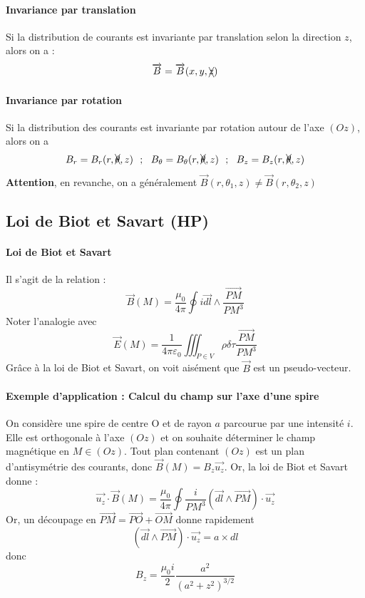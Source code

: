 \documentclass[french]{book}
\theoremstyle{plain}
\theoremstyle{definition}
\theoremstyle{remark}
\begin{document}
\paragraph{Invariance par translation} Si la distribution de courants est invariante par translation selon la direction $z$, alors on a : $$\overrightarrow{B}=\overrightarrow{B}(x,y,\xcancel{z})$$
\paragraph{Invariance par rotation} Si la distribution des courants est invariante par rotation autour de l'axe $(Oz)$, alors on a $$B_r=B_r(r,\xcancel{\theta},z)\ \ ; \ \ B_\theta=B_\theta(r,\xcancel{\theta},z) \ \ ; \ \ B_z=B_z(r,\xcancel{\theta},z)$$ \textbf{Attention}, en revanche, on a généralement $\overrightarrow{B}(r,\theta_1,z)\ne\overrightarrow{B}(r,\theta_2,z)$
\subsection{Loi de Biot et Savart (HP)}
\paragraph{Loi de Biot et Savart} Il s'agit de la relation : $$\overrightarrow{B}(M)=\frac{\mu_0}{4\pi}\oint i\overrightarrow{dl}\wedge\frac{\overrightarrow{PM}}{PM^3}$$ Noter l'analogie avec  $$\overrightarrow{E}(M)=\frac{1}{4\pi\varepsilon_0}\iiint_{P\in V} \rho\delta\tau\frac{\overrightarrow{PM}}{PM^3}$$ Grâce à la loi de Biot et Savart, on voit aisément que $\overrightarrow{B}$ est un pseudo-vecteur.
\paragraph{Exemple d'application : Calcul du champ sur l'axe d'une spire} On considère une spire de centre O et de rayon $a$ parcourue par une intensité $i$. Elle est orthogonale à l'axe $(Oz)$ et on souhaite déterminer le champ magnétique en $M\in(Oz)$. Tout plan contenant $(Oz)$ est un plan d'antisymétrie des courants, donc $\overrightarrow{B}(M)=B_z\overrightarrow{u_z}$. Or, la loi de Biot et Savart donne : $$\overrightarrow{u_z}\cdot\overrightarrow{B}(M)=\frac{\mu_0}{4\pi}\oint\frac{i}{PM^3}\left(\overrightarrow{dl}\wedge\overrightarrow{PM}\right)\cdot\overrightarrow{u_z}$$ Or, un découpage en $\overrightarrow{PM}=\overrightarrow{PO}+\overrightarrow{OM}$ donne rapidement $$\left(\overrightarrow{dl}\wedge\overrightarrow{PM}\right)\cdot\overrightarrow{u_z}=a\times dl$$ donc $$B_z=\frac{\mu_0 i}{2}\frac{a^2}{(a^2+z^2)^{3/2}}$$
\end{document}

